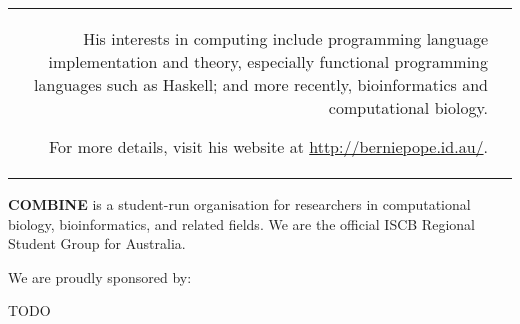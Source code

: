 \documentclass[11pt]{article}
\begin{document}
\begin{minipage}[t]{\linewidth}
\begin{tabu}{rX}
\begin{varwidth}[t]{\linewidth}
                    \medskip
                    His interests in computing include programming language
                    implementation and theory, especially functional
                    programming languages such as Haskell; and more
                    recently, bioinformatics and computational biology.\par
                    \medskip
                    For more details, visit his website at
                    \href{http://berniepope.id.au/}{http://berniepope.id.au/}.
                \end{varwidth}\\
    \end{tabu}
\end{minipage}
    \vfill
    \noindent\begin{minipage}[t]{\textwidth}
        \textbf{COMBINE} is a student-run organisation for researchers in computational
        biology, bioinformatics, and related fields. We are the official ISCB Regional Student
        Group for Australia.\par
        \medskip
        We are proudly sponsored by:\par
        \begin{minipage}[t]{\textwidth}
            TODO
        \end{minipage}
    \end{minipage}
\end{document}
